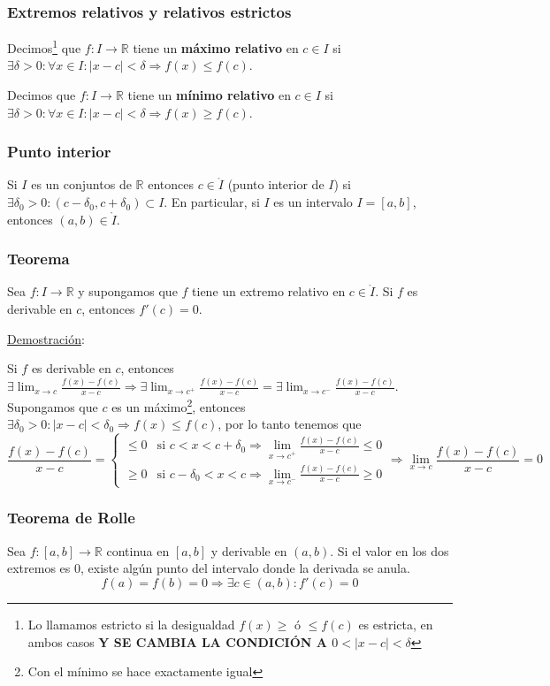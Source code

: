 \documentclass[10pt,a4paper,openright]{book}
\begin{document}
\subsubsection*{Extremos relativos y relativos estrictos}
Decimos\footnote{Lo llamamos estricto si la desigualdad $f(x)\geq \mbox{ ó }\leq f(c)$ es estricta, en ambos casos \textbf{Y SE CAMBIA LA CONDICIÓN A $0<|x-c|<\delta$}} que $f:I\rightarrow \mathbb R$ tiene un \textbf{máximo relativo} en $c\in I$ si $\exists \delta>0: \forall x \in I: |x-c|<\delta \Rightarrow f(x)\leq f(c)$.

Decimos que $f:I\rightarrow \mathbb R$ tiene un \textbf{mínimo relativo} en $c\in I$ si $\exists \delta>0: \forall x \in I: |x-c|<\delta \Rightarrow f(x)\geq f(c)$.

\subsubsection*{Punto interior}
Si $I$ es un conjuntos de $\mathbb R$ entonces $c\in \mathring{I}$ (punto interior de $I$) si $\exists \delta_0 >0: (c-\delta_0, c+\delta_0)\subset I$. En particular, si $I$ es un intervalo $I=[a,b]$, entonces $(a,b)\in \mathring{I}$.

\subsubsection*{Teorema}
Sea $f: I\rightarrow \mathbb R$ y supongamos que $f$ tiene un extremo relativo en $c\in \mathring{I}$. Si $f$ es derivable en $c$, entonces $f'(c)=0$.

\underline{Demostración}:

Si $f$ es derivable en $c$, entonces $\exists \lim_{x\rightarrow c} \frac{f(x)-f(c)}{x-c}\Rightarrow \exists \lim_{x\rightarrow c^+} \frac{f(x)-f(c)}{x-c} = \exists \lim_{x\rightarrow c^-} \frac{f(x)-f(c)}{x-c}$. Supongamos que $c$ es un máximo\footnote{Con el mínimo se hace exactamente igual}, entonces $\exists\delta_0 >0 : |x-c|<\delta_0\Rightarrow f(x)\leq f(c)$, por lo tanto tenemos que
$$\frac{f(x)-f(c)}{x-c}=\begin{cases}\leq 0 &\mbox{si } c<x<c+\delta_0  \Rightarrow \lim_{x\rightarrow c^+}\frac{f(x)-f(c)}{x-c} \leq 0\\ \geq 0 &\mbox{si } c-\delta_0 < x <c  \Rightarrow \lim_{x\rightarrow c^-}\frac{f(x)-f(c)}{x-c} \geq 0\end{cases}\Rightarrow \lim_{x\rightarrow c}\frac{f(x)-f(c)}{x-c}= 0$$

\subsubsection*{Teorema de Rolle}
Sea $f: [a,b]\rightarrow \mathbb R$ continua en $[a,b]$ y derivable en $(a,b)$. Si el valor en los dos extremos es 0, existe algún punto del intervalo donde la derivada se anula.
$$f(a)=f(b)=0\Rightarrow \exists c\in (a,b): f'(c)=0$$
\end{document}

